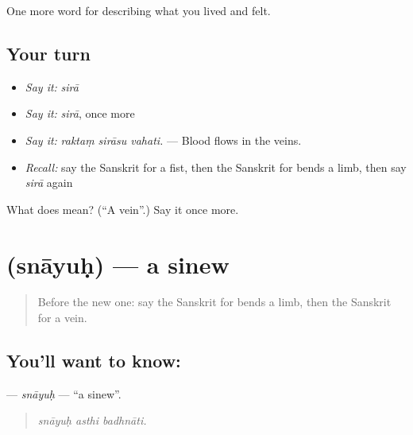 \begin{grammarlens}[title={What you've built}]
One more word for describing what you lived and felt.
\end{grammarlens}

\subsection*{Your turn}
\begin{itemize}
\raggedright
  \item \emph{Say it:} \emph{sirā}
  \item \emph{Say it:} \emph{sirā}, once more
  \item \emph{Say it:} \emph{raktaṃ sirāsu vahati.} — Blood flows in the veins.
  \item \emph{Recall:} say the Sanskrit for a fist, then the Sanskrit for bends a limb, then say \emph{sirā} again
\end{itemize}

\begin{tcolorbox}[breakable,colback=teal!4,colframe=teal!35!black,title={Before you move on}]
What does  mean? (\textquotedblleft{}A vein\textquotedblright{}.) Say it once more.
\end{tcolorbox}
\section[\texorpdfstring{\sk{स्नायुः} (snāyuḥ)}{स्नायुः (snāyuḥ)}]{ (snāyuḥ) — a sinew}

\label{lesson:SA-C474-snayuh}



\begin{quote}
Before the new one: say the Sanskrit for bends a limb, then the Sanskrit for a vein.
\end{quote}

\subsection*{You'll want to know: }
\textbf{} — \emph{snāyuḥ} — \textquotedblleft{}a sinew\textquotedblright{}.

\begin{quote}
  
\end{quote}

\begin{quote}
\emph{snāyuḥ asthi badhnāti.}
\end{quote}

